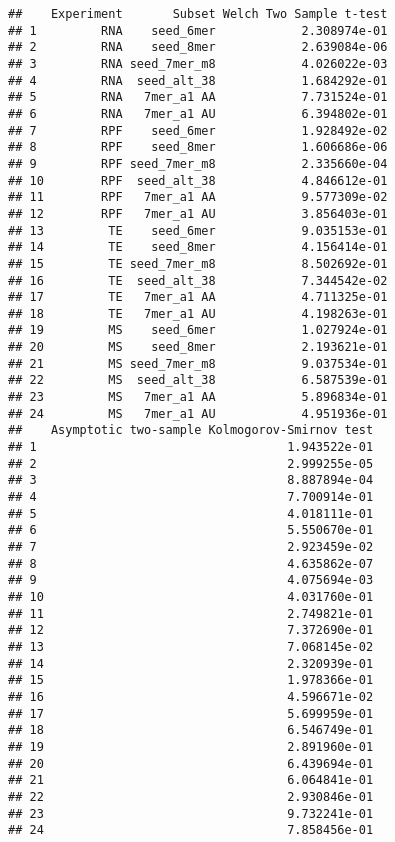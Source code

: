 \documentclass[
]{article}
\begin{document}
\begin{verbatim}
##    Experiment       Subset Welch Two Sample t-test
## 1         RNA    seed_6mer            2.308974e-01
## 2         RNA    seed_8mer            2.639084e-06
## 3         RNA seed_7mer_m8            4.026022e-03
## 4         RNA  seed_alt_38            1.684292e-01
## 5         RNA   7mer_a1 AA            7.731524e-01
## 6         RNA   7mer_a1 AU            6.394802e-01
## 7         RPF    seed_6mer            1.928492e-02
## 8         RPF    seed_8mer            1.606686e-06
## 9         RPF seed_7mer_m8            2.335660e-04
## 10        RPF  seed_alt_38            4.846612e-01
## 11        RPF   7mer_a1 AA            9.577309e-02
## 12        RPF   7mer_a1 AU            3.856403e-01
## 13         TE    seed_6mer            9.035153e-01
## 14         TE    seed_8mer            4.156414e-01
## 15         TE seed_7mer_m8            8.502692e-01
## 16         TE  seed_alt_38            7.344542e-02
## 17         TE   7mer_a1 AA            4.711325e-01
## 18         TE   7mer_a1 AU            4.198263e-01
## 19         MS    seed_6mer            1.027924e-01
## 20         MS    seed_8mer            2.193621e-01
## 21         MS seed_7mer_m8            9.037534e-01
## 22         MS  seed_alt_38            6.587539e-01
## 23         MS   7mer_a1 AA            5.896834e-01
## 24         MS   7mer_a1 AU            4.951936e-01
##    Asymptotic two-sample Kolmogorov-Smirnov test
## 1                                   1.943522e-01
## 2                                   2.999255e-05
## 3                                   8.887894e-04
## 4                                   7.700914e-01
## 5                                   4.018111e-01
## 6                                   5.550670e-01
## 7                                   2.923459e-02
## 8                                   4.635862e-07
## 9                                   4.075694e-03
## 10                                  4.031760e-01
## 11                                  2.749821e-01
## 12                                  7.372690e-01
## 13                                  7.068145e-02
## 14                                  2.320939e-01
## 15                                  1.978366e-01
## 16                                  4.596671e-02
## 17                                  5.699959e-01
## 18                                  6.546749e-01
## 19                                  2.891960e-01
## 20                                  6.439694e-01
## 21                                  6.064841e-01
## 22                                  2.930846e-01
## 23                                  9.732241e-01
## 24                                  7.858456e-01
\end{verbatim}
\end{document}
